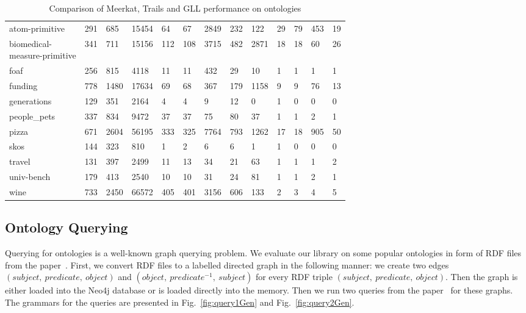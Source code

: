 \begin{table*}[t]
\begin{tabular}{|l|ll|lllll|lllll|}
\hline\hline
atom-primitive              & 291 & 685  & 15454 & 64  & 67 & 2849 & 232 & 122  &  29 &  79 & 453 & 19 \\
\shortstack[l]{biomedical- \\
 measure-primitive}         & 341 & 711  & 15156 & 112 & 108 & 3715 & 482 & 2871 &  18 & 18 & 60  & 26 \\
foaf                        & 256 & 815  & 4118  & 11  & 11  & 432  & 29  & 10   &  1  & 1  & 1   & 1 \\
funding                     & 778 & 1480 & 17634 & 69  & 68  & 367  & 179 & 1158 &  9  & 9   & 76  & 13 \\
generations                 & 129 & 351  & 2164  & 4   & 4   & 9    & 12  & 0    &  1  & 0  & 0   & 0 \\
people\_pets                & 337 & 834  & 9472  & 37  & 37  & 75   & 80  & 37   &  1  & 1  & 2   & 1 \\
pizza                       & 671 & 2604 & 56195 & 333 & 325 & 7764 & 793 & 1262 &  17 & 18 & 905 & 50 \\
skos                        & 144 & 323  & 810   & 1   & 2   & 6    & 6   & 1    &  1  & 0  & 0   & 0 \\
travel                      & 131 & 397  & 2499  & 11  & 13  & 34   & 21  & 63   &  1  & 1  & 1   & 2 \\
univ-bench                  & 179 & 413  & 2540  & 10  & 10  & 31   & 24  & 81   &  1  & 1  & 2   & 1 \\
wine                        & 733 & 2450 & 66572 & 405 & 401 & 3156 & 606 & 133  &  2  & 3  & 4   & 5 \\
\hline
\end{tabular}
\caption{Comparison of Meerkat, Trails and GLL performance on ontologies}
\label{table:rdfs}
\end{table*}


\subsection{Ontology Querying}
\label{sec:ontology}

Querying for ontologies is a well-known graph querying problem. We evaluate our library on some popular ontologies in form of RDF files from the paper~\cite{CFGonRDF}.
First, we convert RDF files to a labelled directed graph in the following manner: we create two edges $(subject,\ predicate,\ object)$ and $(object,\ predicate^{-1},\ subject)$ for every RDF triple $(subject,\ predicate,\ object)$. Then the graph is either loaded into the Neo4j database or is loaded directly into the memory.
Then we run two queries from the paper~\cite{GrigorevR16} for these graphs. The grammars for the queries are presented in Fig.~\ref{fig:query1Gen} and Fig.~\ref{fig:query2Gen}.

